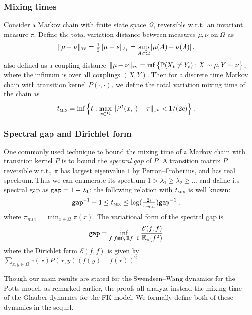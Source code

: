 \documentclass[reqno,11pt]{amsart}
\numberwithin{equation}{section}
\theoremstyle{definition}{
\newtheorem{example}[theorem]{Example}
\newtheorem{definition}[theorem]{Definition}
\newtheorem*{definition*}{Definition}
\newtheorem{problem}[theorem]{Problem}
\newtheorem{question}[theorem]{Question}
\newtheorem{remark}[theorem]{Remark}
}
\newcommand{\tmix}{t_{\textsc{mix}}}
\newcommand{\gap}{\text{\tt{gap}}}
\newcommand{\tv}{{\textsc{tv}}}
\begin{document}
\subsubsection*{Mixing times} Consider a Markov chain with finite state space $\Omega$, reversible w.r.t.\ an invariant measure $\pi$. Define the total variation distance between measures $\mu,\nu$ on $\Omega$ as
\[\|\mu-\nu\|_\tv=\tfrac 12 \|\mu-\nu\|_{\ell_1}=\sup_{A\subset \Omega} |\mu (A)-\nu(A)|\,,
\]
also defined as a coupling distance $\|\mu-\nu\|_{\tv} =\inf\big\{\mathbb P(X_t\neq Y_t):X\sim \mu,Y\sim \nu\big\}$,
where the infimum is over all couplings $(X,Y)$. Then for a discrete time Markov chain with transition kernel $P(\cdot,\cdot)$, 
we define the total variation mixing time of the chain as
\[\tmix = \inf \Big\{t:\max_{x\in \Omega} \|P^t(x,\cdot)-\pi\|_\tv< 1/(2e)\Big\}\,.
\]

\subsubsection*{Spectral gap and Dirichlet form}
One commonly used technique to bound the mixing time of a Markov chain with transition kernel $P$ is to bound the \emph{spectral gap} of $P$. A transition matrix $P$ reversible w.r.t., $\pi$ has largest eigenvalue $1$ by Perron--Frobenius, and has real spectrum. Thus we can enumerate its spectrum $1>\lambda_1\geq\lambda_2\geq...$ and define its spectral gap as $\gap=1-\lambda_1$; the following  relation with $\tmix$ is well known:
\begin{align}\label{eq:gap-tmix}
\gap^{-1} -1\leq \tmix \leq \log(\tfrac{2e}{\pi_{min}}) \gap^{-1}\,,
\end{align}
where $\pi_{min} = \min_{x\in \Omega} \pi (x)$. The variational form of the spectral gap is
\begin{align}\label{eq:dirichlet-form}
\gap= \inf_{f: f\not \equiv 0, \, \mathbb E f= 0} \frac {\mathcal E(f,f)} {\mathbb E_\pi (f^2)}
\end{align}
where the Dirichlet form $\mathcal E(f,f)$ is given by $\sum_{x,y\in \Omega} \pi(x)P(x,y) (f(y)-f(x))^2$.

Though our main results are stated for the Swendsen--Wang dynamics for the Potts model, as remarked earlier, the proofs all analyze instead the mixing time of the Glauber dynamics for the FK model. We formally define both of these dynamics in the sequel.
\end{document}
